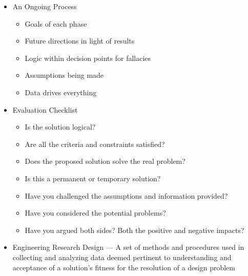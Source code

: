 \begin{itemize}

  \item An Ongoing Process

    \begin{itemize}

      \item Goals of each phase

      \item Future directions in light of results

      \item Logic within decision points for fallacies

      \item Assumptions being made

      \item Data drives everything

    \end{itemize}

  \item Evaluation Checklist

    \begin{itemize}

      \item Is the solution logical?

      \item Are all the criteria and constraints satisfied?

      \item Does the proposed solution solve the real problem?

      \item Is this a permanent or temporary solution?

      \item Have you challenged the assumptions and information provided?

      \item Have you considered the potential problems?

      \item Have you argued both sides? Both the positive and negative impacts?

    \end{itemize}

  \item Engineering Research Design — A set of methods and procedures used in collecting and analyzing data deemed pertinent to understanding and acceptance of a solution's fitness for the resolution of a design problem


\end{itemize}
